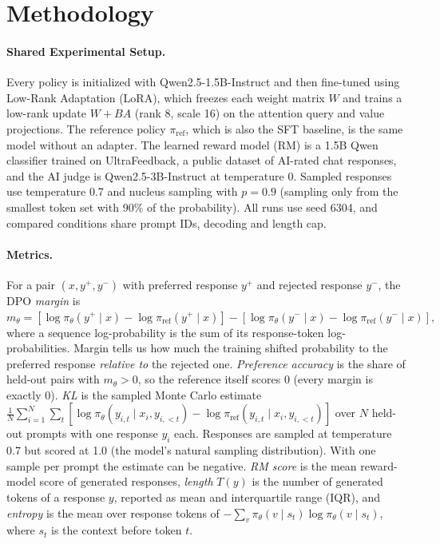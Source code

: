 \documentclass{article}
\begin{document}
\section{Methodology}
\label{sec:methods}

\paragraph{Shared Experimental Setup.} Every policy is initialized with Qwen2.5-1.5B-Instruct and then fine-tuned using Low-Rank Adaptation (LoRA), which freezes each weight matrix $W$ and trains a low-rank update $W + BA$ (rank 8, scale 16) on the attention query and value projections. The reference policy $\pi_{\text{ref}}$, which is also the SFT baseline, is the same model without an adapter. The learned reward model (RM) is a 1.5B Qwen classifier trained on UltraFeedback, a public dataset of AI-rated chat responses, and the AI judge is Qwen2.5-3B-Instruct at temperature 0. Sampled responses use temperature 0.7 and nucleus sampling with $p=0.9$ (sampling only from the smallest token set with 90\% of the probability). All runs use seed 6304, and compared conditions share prompt IDs, decoding and length cap.

\paragraph{Metrics.} For a pair $(x, y^+, y^-)$ with preferred response $y^+$ and rejected response $y^-$, the DPO \emph{margin} is $ m_\theta = [\log \pi_\theta(y^+ \mid x) - \log \pi_{\text{ref}}(y^+ \mid x)] - [\log \pi_\theta(y^- \mid x) - \log \pi_{\text{ref}}(y^- \mid x)], $ where a sequence log-probability is the sum of its response-token log-probabilities. Margin tells us how much the training shifted probability to the preferred response \textit{relative to} the rejected one. \emph{Preference accuracy} is the share of held-out pairs with $m_\theta > 0$, so the reference itself scores 0 (every margin is exactly 0). \emph{KL} is the sampled Monte Carlo estimate $\frac{1}{N}\sum_{i=1}^{N} \sum_{t} [\log \pi_\theta(y_{i,t} \mid x_i, y_{i,<t}) - \log \pi_{\text{ref}}(y_{i,t} \mid x_i, y_{i,<t})]$ over $N$ held-out prompts with one response $y_i$ each. Responses are sampled at temperature 0.7 but scored at 1.0 (the model's natural sampling distribution). With one sample per prompt the estimate can be negative. \emph{RM score} is the mean reward-model score of generated responses, \emph{length} $T(y)$ is the number of generated tokens of a response $y$, reported as mean and interquartile range (IQR), and \emph{entropy} is the mean over response tokens of $-\sum_v \pi_\theta(v \mid s_t) \log \pi_\theta(v \mid s_t)$, where $s_t$ is the context before token $t$.
\end{document}
